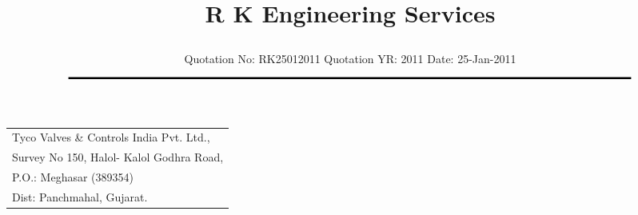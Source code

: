 \documentclass[11pt]{article}
\title{\vspace*{-1.5cm} \centerline{ \Huge \bf \hspace{0cm} R K Engineering Services}\vspace*{-0.75cm}}
\author{%
 \scriptsize Quotation No: RK25012011  \hspace*{4cm}  Quotation YR: 2011 \hspace*{4cm} Date: 25-Jan-2011\\
$\rule{7.0in}{0.5mm}$}
\date{}
\begin{document}
\maketitle
\thispagestyle{empty}
\vspace*{-1cm}	
\begin{flushleft}
{\footnotesize
\begin{tabular}{l}
Tyco Valves \& Controls India Pvt. Ltd.,\\
Survey No 150, Halol- Kalol Godhra Road,\\
P.O.:  Meghasar (389354)\\
Dist: Panchmahal, Gujarat.\\
\end{tabular}
}
\end{flushleft}

\vspace*{1cm}

\vspace*{-1cm}

\end{document}
